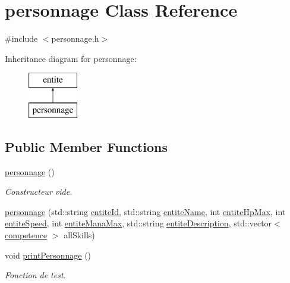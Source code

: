 \hypertarget{classpersonnage}{}\section{personnage Class Reference}
\label{classpersonnage}


{\ttfamily \#include $<$personnage.\+h$>$}

Inheritance diagram for personnage\+:\begin{figure}[H]
\begin{center}
\leavevmode
\includegraphics[height=2.000000cm]{classpersonnage}
\end{center}
\end{figure}
\subsection*{Public Member Functions}
\begin{DoxyCompactItemize}
\item 
\hyperlink{classpersonnage_acd9ca516f8c5c110687e5167dab8db59}{personnage} ()
\begin{DoxyCompactList}\small\item\em Constructeur vide. \end{DoxyCompactList}\item 
\hyperlink{classpersonnage_adec7b6f38637e7d176e054b68b0fcb23}{personnage} (std\+::string \hyperlink{classentite_a904e8783de9fe2fc4306bf6b7822d025}{entite\+Id}, std\+::string \hyperlink{classentite_abe631a515b1cd0866dcfb078c4ceb07a}{entite\+Name}, int \hyperlink{classentite_a754557f56c1c1fcbcbd40eec68b60f65}{entite\+Hp\+Max}, int \hyperlink{classentite_ad9df70a9bb07f07b3ebf520941c3a35f}{entite\+Speed}, int \hyperlink{classentite_a696167d32c27b3b2a2fa6b473a888b18}{entite\+Mana\+Max}, std\+::string \hyperlink{classentite_a6fab1d9a04ade2cb97ec0904b12c82c9}{entite\+Description}, std\+::vector$<$ \hyperlink{classcompetence}{competence} $>$ all\+Skills)
\item 
void \hyperlink{classpersonnage_a173f1b07d9098a96fd189ede2e7dad59}{print\+Personnage} ()
\begin{DoxyCompactList}\small\item\em Fonction de test. \end{DoxyCompactList}\end{DoxyCompactItemize}
